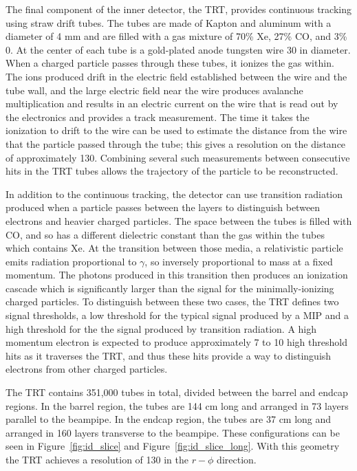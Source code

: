 The final component of the inner detector, the \ac{TRT}, provides continuous tracking using straw drift tubes.
The tubes are made of Kapton and aluminum with a diameter of 4 mm and are filled with a gas mixture of 70\% Xe, 27\% CO, and 3\% 0. 
At the center of each tube is a gold-plated anode tungsten wire 30 \um in diameter.
When a charged particle passes through these tubes, it ionizes the gas within.
The ions produced drift in the electric field established between the wire and the tube wall, and the large electric field near the wire produces avalanche multiplication and results in an electric current on the wire that is read out by the electronics and provides a track measurement.
The time it takes the ionization to drift to the wire can be used to estimate the distance from the wire that the particle passed through the tube; this gives a resolution on the distance of approximately 130\um.
Combining several such measurements between consecutive hits in the \ac{TRT} tubes allows the trajectory of the particle to be reconstructed.

In addition to the continuous tracking, the detector can use transition radiation produced when a particle passes between the layers to distinguish between electrons and heavier charged particles.
The space between the tubes is filled with CO, and so has a different dielectric constant than the gas within the tubes which contains Xe.
At the transition between those media, a relativistic particle emits radiation proportional to $\gamma$, so inversely proportional to mass at a fixed momentum.
The photons produced in this transition then produces an ionization cascade which is significantly larger than the signal for the minimally-ionizing charged particles.
To distinguish between these two cases, the \ac{TRT} defines two signal thresholds, a low threshold for the typical signal produced by a \ac{MIP} and a high threshold for the the signal produced by transition radiation.
A high momentum electron is expected to produce approximately 7 to 10 high threshold hits as it traverses the \ac{TRT}, and thus these hits provide a way to distinguish electrons from other charged particles. 

The \ac{TRT} contains 351,000 tubes in total, divided between the barrel and endcap regions. 
In the barrel region, the tubes are 144 cm long and arranged in 73 layers parallel to the beampipe.
In the endcap region, the tubes are 37 cm long and arranged in 160 layers transverse to the beampipe.
These configurations can be seen in Figure~\ref{fig:id_slice} and Figure~\ref{fig:id_slice_long}. 
With this geometry the \ac{TRT} achieves a resolution of 130 \um  in the $r-\phi$ direction.

